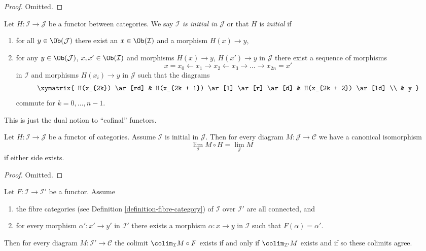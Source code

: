 \begin{proof}
Omitted.
\end{proof}

\begin{definition}
\label{definition-initial}
Let $H : \mathcal{I} \to \mathcal{J}$ be a functor between categories.
We say {\it $\mathcal{I}$ is initial in $\mathcal{J}$} or that
$H$ is {\it initial} if
\begin{enumerate}
\item for all $y \in \Ob(\mathcal{J})$ there exist an
$x \in \Ob(\mathcal{I})$ and a morphism $H(x) \to y$,
\item for any $y \in \Ob(\mathcal{J})$, $x , x' \in \Ob(\mathcal{I})$ and
morphisms $H(x) \to y$, $H(x') \to y$ in $\mathcal{J}$
there exist a sequence of morphisms
$$
x = x_0 \leftarrow x_1 \rightarrow x_2 \leftarrow x_3 \rightarrow \ldots
\rightarrow x_{2n} = x'
$$
in $\mathcal{I}$ and morphisms $H(x_i) \to y$ in $\mathcal{J}$
such that the diagrams
$$
\xymatrix{
H(x_{2k}) \ar[rd] &
H(x_{2k + 1}) \ar[l] \ar[r] \ar[d] &
H(x_{2k + 2}) \ar[ld] \\
& y
}
$$
commute for $k = 0, \ldots, n - 1$.
\end{enumerate}
\end{definition}

\noindent
This is just the dual notion to ``cofinal'' functors.

\begin{lemma}
\label{lemma-initial}
Let $H : \mathcal{I} \to \mathcal{J}$ be a functor of categories.
Assume $\mathcal{I}$ is initial in $\mathcal{J}$.
Then for every diagram $M : \mathcal{J} \to \mathcal{C}$ we
have a canonical isomorphism
$$
\lim_\mathcal{I} M \circ H = \lim_\mathcal{J} M
$$
if either side exists.
\end{lemma}

\begin{proof}
Omitted.
\end{proof}

\begin{lemma}
\label{lemma-colimit-constant-connected-fibers}
Let $F : \mathcal{I} \to \mathcal{I}'$ be a functor.
Assume
\begin{enumerate}
\item the fibre categories (see
Definition \ref{definition-fibre-category})
of $\mathcal{I}$ over $\mathcal{I}'$ are all connected, and
\item for every morphism $\alpha' : x' \to y'$ in $\mathcal{I}'$ there
exists a morphism $\alpha : x \to y$ in $\mathcal{I}$ such that
$F(\alpha) = \alpha'$.
\end{enumerate}
Then for every diagram $M : \mathcal{I}' \to \mathcal{C}$
the colimit $\colim_\mathcal{I} M \circ F$ exists if and only
if $\colim_{\mathcal{I}'} M$ exists and if so these colimits
agree.
\end{lemma}

